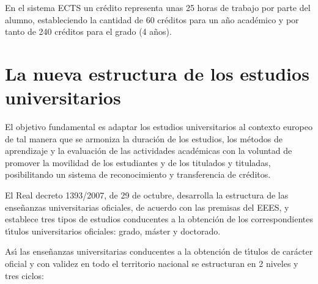 En el sistema ECTS un cr\'{e}dito representa unas 25 horas de trabajo por
 parte del alumno, estableciendo la cantidad de 60 cr\'{e}ditos para un
 a\~no acad\'{e}mico y por tanto de 240 cr\'{e}ditos para el grado (4 a\~nos).

\section{La nueva estructura de los estudios universitarios}

El objetivo fundamental es adaptar los estudios universitarios al contexto 
europeo de tal manera que se armoniza la duraci\'{o}n de los estudios, 
los m\'{e}todos de aprendizaje y la evaluaci\'{o}n de las actividades 
acad\'{e}micas con la voluntad de promover la movilidad de los estudiantes
 y de los titulados y tituladas, posibilitando un sistema de reconocimiento y
 transferencia de cr\'{e}ditos.

El Real decreto 1393/2007, de 29 de octubre, desarrolla la estructura de las 
ense\~nanzas universitarias oficiales, de acuerdo con las premisas del
 EEES, y establece tres tipos de estudios conducentes a la obtenci\'{o}n
 de los correspondientes t\'{\i}tulos universitarios oficiales:
 grado, m\'{a}ster y doctorado.

As\'{\i} las ense\~{n}anzas universitarias conducentes a la 
obtenci\'{o}n de t\'{\i}tulos de car\'{a}cter oficial y con validez en 
todo el territorio nacional se estructuran en 2 niveles 
y tres ciclos: 

